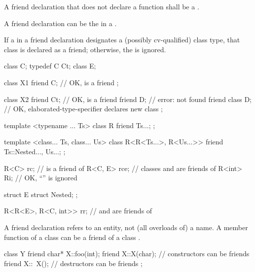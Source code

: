 \pnum
A friend declaration that does not declare a function
shall be a .

\begin{note}
A friend declaration can be the
 in
a .
\end{note}
If a  in a friend declaration
designates a (possibly
cv-qualified) class type, that class is declared as a friend; otherwise, the
 is ignored.
\begin{example}
\begin{codeblock}
class C;
typedef C Ct;
class E;

class X1 {
  friend C;                     // OK,  is a friend
};

class X2 {
  friend Ct;                    // OK,  is a friend
  friend D;                     // error:  not found
  friend class D;               // OK, elaborated-type-specifier declares new class
};

template <typename ... Ts> class R {
  friend Ts...;
};

template <class... Ts, class... Us>
class R<R<Ts...>, R<Us...>> {
  friend Ts::Nested..., Us...;
};

R<C> rc;                        //  is a friend of 
R<C, E> rce;                    // classes  and  are friends of 
R<int> Ri;                      // OK, ``'' is ignored

struct E { struct Nested; };

R<R<E>, R<C, int>> rr;          //  and  are friends of 
\end{codeblock}
\end{example}

\pnum
{}%
\begin{note}
A friend declaration refers to an entity, not (all overloads of) a name.
A member function of a class
can be a friend of
a class
.
%
\begin{example}
\begin{codeblock}
class Y {
  friend char* X::foo(int);
  friend X::X(char);            // constructors can be friends
  friend X::~X();               // destructors can be friends
};
\end{codeblock}
\end{example}
\end{note}

